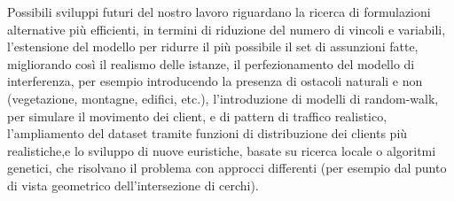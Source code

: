 Possibili sviluppi futuri del nostro lavoro riguardano la ricerca di formulazioni alternative più efficienti, in termini di riduzione del numero di vincoli e variabili, l'estensione del modello per ridurre il più possibile il set di assunzioni fatte, migliorando così il realismo delle istanze, il perfezionamento del modello di interferenza, per esempio introducendo la presenza di ostacoli naturali e non (vegetazione, montagne, edifici, etc.), l'introduzione di modelli di random-walk, per simulare il movimento dei client, e di pattern di traffico realistico, l'ampliamento del dataset tramite funzioni di distribuzione dei clients più realistiche,e lo sviluppo di nuove euristiche, basate su ricerca locale o algoritmi genetici, che risolvano il problema con approcci differenti (per esempio dal punto di vista geometrico dell'intersezione di cerchi).    
